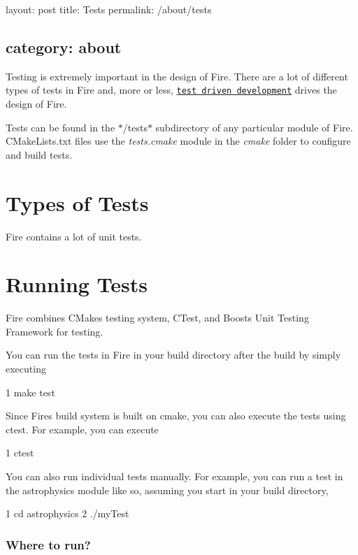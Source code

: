 

 layout\+: post title\+: Tests permalink\+: /about/tests \subsection*{category\+: about }

Testing is extremely important in the design of Fire. There are a lot of different types of tests in Fire and, more or less, \href{https://en.wikipedia.org/wiki/Test-driven_development}{\tt test driven development} drives the design of Fire.

Tests can be found in the $\ast$/tests$\ast$ subdirectory of any particular module of Fire. C\+Make\+Lists.\+txt files use the {\itshape tests.\+cmake} module in the {\itshape cmake} folder to configure and build tests.

\section*{Types of Tests}

Fire contains a lot of unit tests.

\section*{Running Tests}

Fire combines C\+Make\textquotesingle{}s testing system, C\+Test, and Boost\textquotesingle{}s Unit Testing Framework for testing.

You can run the tests in Fire in your build directory after the build by simply executing


\begin{DoxyCode}
1 make test
\end{DoxyCode}


Since Fire\textquotesingle{}s build system is built on cmake, you can also execute the tests using ctest. For example, you can execute


\begin{DoxyCode}
1 ctest
\end{DoxyCode}


You can also run individual tests manually. For example, you can run a test in the astrophysics module like so, assuming you start in your build directory,


\begin{DoxyCode}
1 cd astrophysics
2 ./myTest
\end{DoxyCode}


\subsubsection*{Where to run?}

